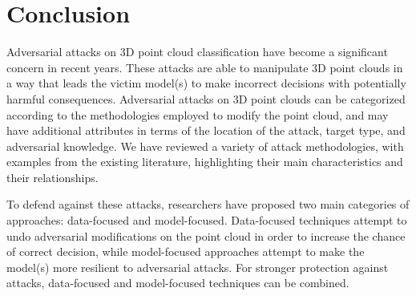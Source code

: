 \documentclass{ieeeaccess}
\begin{document}




\section{Conclusion}
\label{sec:Conclusion}

Adversarial attacks on 3D point cloud classification have become a significant concern in recent years. These attacks are able to manipulate 3D point clouds in a way that leads the victim model(s) to make incorrect decisions with potentially harmful consequences. Adversarial attacks on 3D point clouds can be categorized according to the methodologies employed to modify the point cloud, and may have additional attributes in terms of the location of the attack, target type, and adversarial knowledge. We have reviewed a variety of attack methodologies, with examples from the existing literature, highlighting their main characteristics and their relationships. %

To defend against these attacks, researchers have proposed two main categories of approaches: data-focused and model-focused. Data-focused techniques attempt to undo adversarial modifications on the point cloud in order to increase the chance of correct decision, while model-focused approaches attempt to make the model(s) more resilient to adversarial attacks. %
For stronger protection against %
attacks, data-focused and model-focused %
techniques can be combined. %
\end{document}

